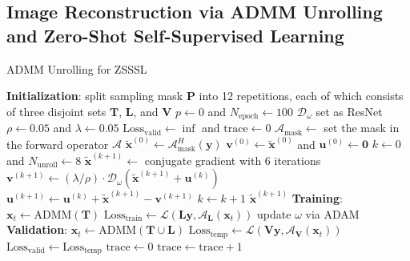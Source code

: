 \documentclass[journal,twoside,web]{ieeecolor}
\begin{document}
    \subsection{Image Reconstruction via ADMM Unrolling and Zero-Shot Self-Supervised Learning}

	\begin{algorithm}
		\caption{ADMM Unrolling for ZSSSL} \label{ALG:ADMM}
		\begin{algorithmic}[1]
			\State \textbf{Initialization}:
			\State \;\; split sampling mask $\mathbf{P}$ into 12 repetitions, each of which consists of three disjoint sets $\mathbf{T}$, $\mathbf{L}$, and $\mathbf{V}$
			\State \;\: $p \gets 0$ and $N_{\mathrm{epoch}} \gets 100$
			\State \;\; $\mathcal{D}_{\omega}$ set as ResNet
			\State \;\; $\rho \gets 0.05$ and $\lambda \gets 0.05$
			\State \;\; $\mathrm{Loss}_{\mathrm{valid}} \gets \inf$ and $\mathrm{trace} \gets 0$
			\State $\mathcal{A}_\mathrm{mask} \gets$ set the mask in the forward operator $\mathcal{A}$
			\State $\tilde{\mathbf{x}}^{(0)} \gets \mathcal{A}_\mathrm{mask}^H (\mathbf{y})$ 
			\State $\mathbf{v}^{(0)} \gets \tilde{\mathbf{x}}^{(0)}$ and $\mathbf{u}^{(0)} \gets \mathbf{0}$
			\State $k \gets 0$ and $N_{\mathrm{unroll}} \gets 8$
			\State $\tilde{\mathbf{x}}^{(k+1)} \gets $ conjugate gradient with 6 iterations
			\State $\mathbf{v}^{(k+1)} \gets (\lambda/\rho) \cdot \mathcal{D}_{\omega} (\mathbf{\tilde{x}}^{(k+1)} + \mathbf{u}^{(k)})$
			\State $\mathbf{u}^{(k+1)} \gets \mathbf{u}^{(k)} + \mathbf{\tilde{x}}^{(k+1)} - \mathbf{v}^{(k+1)}$
			\State $k \gets k+1$
			\EndWhile
			\State \Return $\tilde{\mathbf{x}}^{(k+1)}$
			\EndFunction
			\State \textbf{Training}:
			\State $\mathbf{x}_t \gets \mathrm{ADMM}(\mathbf{T})$
			\State $\mathrm{Loss}_{\mathrm{train}} \gets \mathcal{L}(\mathbf{L} \mathbf{y}, \mathcal{A}_\mathbf{L}(\mathbf{x}_t))$
			\State update $\omega$ via ADAM
			\State \textbf{Validation}:
			\State $\mathbf{x}_t \gets \mathrm{ADMM}(\mathbf{T} \cup \mathbf{L})$
			\State $\mathrm{Loss}_{\mathrm{temp}} \gets \mathcal{L}(\mathbf{V} \mathbf{y}, \mathcal{A}_\mathbf{V}(\mathbf{x}_t))$
			\State $\mathrm{Loss}_{\mathrm{valid}} \gets \mathrm{Loss}_{\mathrm{temp}}$
			\State $\mathrm{trace} \gets 0$
			\Else
			\State $\mathrm{trace} \gets \mathrm{trace} + 1$
			\EndIf
			\EndWhile
		\end{algorithmic}
	\end{algorithm}
\end{document}
